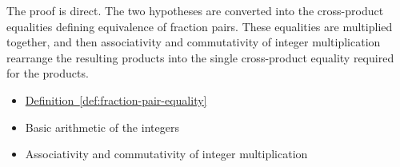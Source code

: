 \begin{remark*}
The proof is direct. The two hypotheses are converted into the
cross-product equalities defining equivalence of fraction pairs. These
equalities are multiplied together, and then associativity and commutativity
of integer multiplication rearrange the resulting products into the single
cross-product equality required for the products.
\end{remark*}

\begin{dependencies}
\begin{itemize}
  \item \hyperref[def:fraction-pair-equality]{Definition~\ref*{def:fraction-pair-equality}}
  \item Basic arithmetic of the integers
  \item Associativity and commutativity of integer multiplication
\end{itemize}
\end{dependencies}